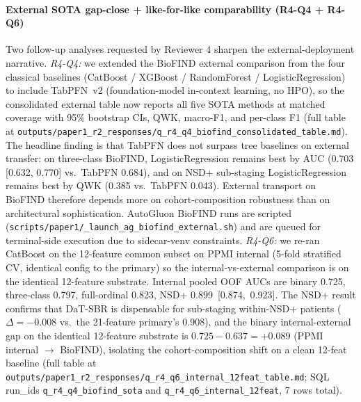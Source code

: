 \documentclass[10pt,letterpaper]{article}
\begin{document}
\paragraph*{External SOTA gap-close + like-for-like comparability (R4-Q4 + R4-Q6)} Two follow-up analyses requested by Reviewer 4 sharpen the external-deployment narrative. \textit{R4-Q4:} we extended the BioFIND external comparison from the four classical baselines (CatBoost / XGBoost / RandomForest / LogisticRegression) to include TabPFN~v2 (foundation-model in-context learning, no HPO), so the consolidated external table now reports all five SOTA methods at matched coverage with 95\% bootstrap CIs, QWK, macro-F1, and per-class F1 (full table at \texttt{outputs/paper1\_r2\_responses/q\_r4\_q4\_biofind\_consolidated\_table.md}). The headline finding is that TabPFN does not surpass tree baselines on external transfer: on three-class BioFIND, LogisticRegression remains best by AUC (0.703 [0.632, 0.770] vs.\ TabPFN 0.684), and on NSD+ sub-staging LogisticRegression remains best by QWK (0.385 vs.\ TabPFN 0.043). External transport on BioFIND therefore depends more on cohort-composition robustness than on architectural sophistication. AutoGluon BioFIND runs are scripted (\texttt{scripts/paper1/\_launch\_ag\_biofind\_external.sh}) and are queued for terminal-side execution due to sidecar-venv constraints. \textit{R4-Q6:} we re-ran CatBoost on the 12-feature common subset on PPMI internal (5-fold stratified CV, identical config to the primary) so the internal-vs-external comparison is on the identical 12-feature substrate. Internal pooled OOF AUCs are binary 0.725, three-class 0.797, full-ordinal 0.823, NSD+ 0.899~[0.874,~0.923]. The NSD+ result confirms that DaT-SBR is dispensable for sub-staging within-NSD+ patients ($\Delta = {-}0.008$ vs.\ the 21-feature primary's 0.908), and the binary internal-external gap on the identical 12-feature substrate is $0.725 - 0.637 = +0.089$ (PPMI internal $\to$ BioFIND), isolating the cohort-composition shift on a clean 12-feat baseline (full table at \texttt{outputs/paper1\_r2\_responses/q\_r4\_q6\_internal\_12feat\_table.md}; SQL run\_ids \texttt{q\_r4\_q4\_biofind\_sota} and \texttt{q\_r4\_q6\_internal\_12feat}, 7 rows total).
\end{document}
